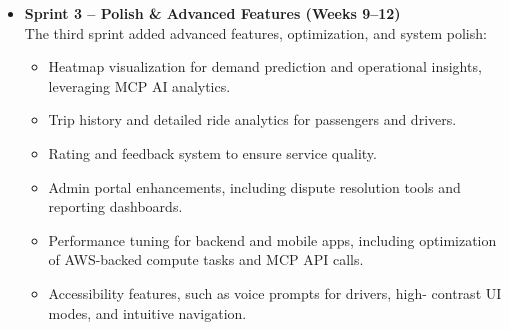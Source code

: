 \begin{itemize}
          \begin{itemize}
 \item Development of \textbf{Passenger and Driver UI components} using
        Flutter, including ride request flows, driver availability status, and
        passenger booking screens.
 \item Implementation of phone-number login with OTP verification,
        leveraging Firebase Authentication.
 \item Driver availability broadcasting and passenger request handling
        via the backend and Firebase Cloud Messaging.
 \item Aggressive local caching using \textbf{Hive} to maintain
        functionality in low-connectivity or intermittent network areas.
 \item Real-time push notifications for ride status updates and driver-
        passenger communication.
 \item Integration of MCP-based AI features into core flows, including
        predictive driver matching and demand forecasting, communicating via
        backend APIs.
 \item Offloading heavy processing tasks to AWS services, such as voice-
        to-text transcription for ride requests.
          \end{itemize}

 \item \textbf{Sprint 3 – Polish \& Advanced Features (Weeks 9–12)} \\
The third sprint added advanced features, optimization, and system polish:

          \begin{itemize}
 \item Heatmap visualization for demand prediction and operational
        insights, leveraging MCP AI analytics.
 \item Trip history and detailed ride analytics for passengers and
        drivers.
 \item Rating and feedback system to ensure service quality.
 \item Admin portal enhancements, including dispute resolution tools and
        reporting dashboards.
 \item Performance tuning for backend and mobile apps, including
        optimization of AWS-backed compute tasks and MCP API calls.
 \item Accessibility features, such as voice prompts for drivers, high-
        contrast UI modes, and intuitive navigation.
          \end{itemize}
\end{itemize}

